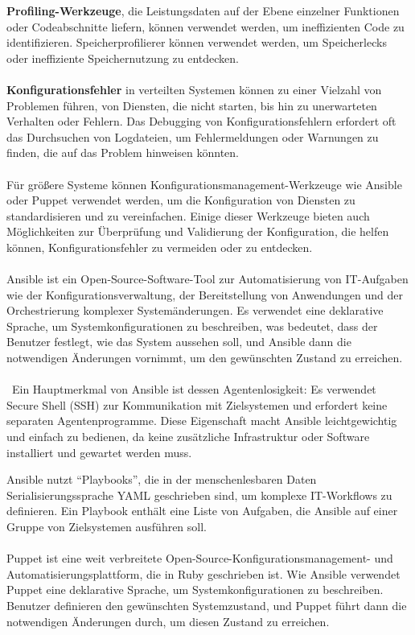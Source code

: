 \documentclass[../vs-script-first-v01.tex]{subfiles}
\begin{document}
\textbf{Profiling-Werkzeuge}, die Leistungsdaten auf der Ebene einzelner Funktionen oder Codeabschnitte liefern, können verwendet werden, um ineffizienten Code zu identifizieren. Speicherprofilierer können verwendet werden, um Speicherlecks oder ineffiziente Speichernutzung zu entdecken. 
\\\\
\textbf{Konfigurationsfehler} in verteilten Systemen können zu einer Vielzahl von Problemen führen, von Diensten, die nicht starten, bis hin zu unerwarteten Verhalten oder Fehlern. Das Debugging von Konfigurationsfehlern erfordert oft das Durchsuchen von Logdateien, um Fehlermeldungen oder Warnungen zu finden, die auf das Problem hinweisen könnten.
\\\\
Für größere Systeme können Konfigurationsmanagement-Werkzeuge wie Ansible oder Puppet verwendet werden, um die Konfiguration von Diensten zu standardisieren und zu vereinfachen. Einige dieser Werkzeuge bieten auch Möglichkeiten zur Überprüfung und Validierung der Konfiguration, die helfen können, Konfigurationsfehler zu vermeiden oder zu entdecken.
\\\\
Ansible ist ein Open-Source-Software-Tool zur Automatisierung von IT-Aufgaben wie der Konfigurationsverwaltung, der Bereitstellung von Anwendungen und der Orchestrierung komplexer Systemänderungen. Es verwendet eine deklarative Sprache, um Systemkonfigurationen zu beschreiben, was bedeutet, dass der Benutzer festlegt, wie das System aussehen soll, und Ansible dann die notwendigen Änderungen vornimmt, um den gewünschten Zustand zu erreichen.
\\\\\
Ein Hauptmerkmal von Ansible ist dessen Agentenlosigkeit: Es verwendet Secure Shell (SSH) zur Kommunikation mit Zielsystemen und erfordert keine separaten Agentenprogramme. Diese Eigenschaft macht Ansible leichtgewichtig und einfach zu bedienen, da keine zusätzliche Infrastruktur oder Software installiert und gewartet werden muss.

Ansible nutzt \enquote{Playbooks}, die in der menschenlesbaren Daten Serialisierungssprache YAML geschrieben sind, um komplexe IT-Workflows zu definieren. Ein Playbook enthält eine Liste von Aufgaben, die Ansible auf einer Gruppe von Zielsystemen ausführen soll.
\\\\
Puppet ist eine weit verbreitete Open-Source-Konfigurationsmanagement- und Automatisierungsplattform, die in Ruby geschrieben ist. Wie Ansible verwendet Puppet eine deklarative Sprache, um Systemkonfigurationen zu beschreiben. Benutzer definieren den gewünschten Systemzustand, und Puppet führt dann die notwendigen Änderungen durch, um diesen Zustand zu erreichen.
\end{document}
